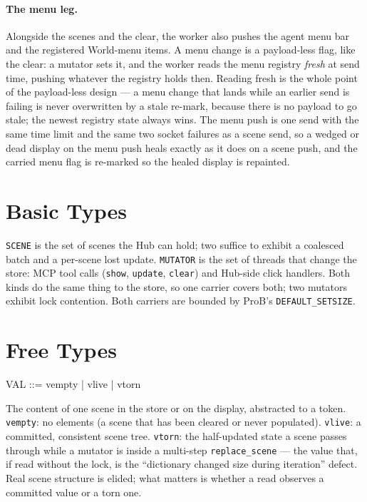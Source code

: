 \documentclass[a4paper,10pt,fleqn]{article}
\begin{document}
\paragraph{The menu leg.}
Alongside the scenes and the clear, the worker also pushes the agent menu
bar and the registered World-menu items.  A menu change is a payload-less
flag, like the clear: a mutator sets it, and the worker reads the menu
registry \emph{fresh} at send time, pushing whatever the registry holds
then.  Reading fresh is the whole point of the payload-less design --- a
menu change that lands while an earlier send is failing is never overwritten
by a stale re-mark, because there is no payload to go stale; the newest
registry state always wins.  The menu push is one send with the same time
limit and the same two socket failures as a scene send, so a wedged or dead
display on the menu push heals exactly as it does on a scene push, and the
carried menu flag is re-marked so the healed display is repainted.

\section{Basic Types}

\begin{zed}
\end{zed}

\texttt{SCENE} is the set of scenes the Hub can hold; two suffice to
exhibit a coalesced batch and a per-scene lost update.  \texttt{MUTATOR}
is the set of threads that change the store: MCP tool calls (\texttt{show},
\texttt{update}, \texttt{clear}) and Hub-side click handlers.  Both kinds
do the same thing to the store, so one carrier covers both; two mutators
exhibit lock contention.  Both carriers are bounded by ProB's
\texttt{DEFAULT\_SETSIZE}.

\section{Free Types}

\begin{zed}
  VAL ::= vempty | vlive | vtorn
\end{zed}

The content of one scene in the store or on the display, abstracted to a
token.  \texttt{vempty}: no elements (a scene that has been cleared or
never populated).  \texttt{vlive}: a committed, consistent scene tree.
\texttt{vtorn}: the half-updated state a scene passes through while a
mutator is inside a multi-step \texttt{replace\_scene} --- the value that,
if read without the lock, is the ``dictionary changed size during
iteration'' defect.  Real scene structure is elided; what matters is
whether a read observes a committed value or a torn one.
\end{document}
